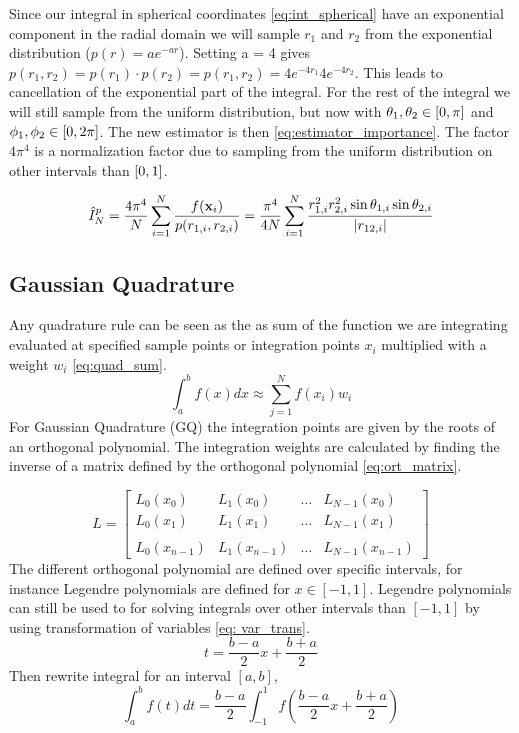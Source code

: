 Since our integral in spherical coordinates \cref{eq:int_spherical} have an exponential
component in the radial domain we will sample $r_1$ and $r_2$ from the exponential distribution
($p(r) = ae^{-ar}$). Setting a = 4 gives
$p(r_1, r_2) = p(r_1) \cdot p(r_2) = p(r_1,r_2) = 4e^{-4r_1} 4e^{-4r_2}$.
This leads to cancellation of the exponential part of the integral. For the
rest of the integral we will still sample from the uniform distribution,
but now with $\theta_1, \theta_2 \in \left[0, \pi\right]$ and
$\phi_1, \phi_2 \in \left[0, 2\pi\right]$.
The new estimator is then
\cref{eq:estimator_importance}. The factor $4\pi^4$ is a normalization factor due
to sampling from the uniform distribution on other intervals than $\left[0,1\right]$.

\begin{equation}
  \label{eq:estimator_importance}
  \hat{I}_N^p
  = \frac{4\pi^4}{N} \sum_{i=1}^{N} \frac{f(\mathbf{x}_i)}{p(r_{1,i},r_{2,i})}
  = \frac{\pi^4}{4N} \sum_{i=1}^{N}
  \frac{r_{1,i}^2 r_{2,i}^2 \sin{\theta_{1,i}} \sin{\theta_{2,i}}}{\abs{r_{12,i}}}
\end{equation}


\subsection{Gaussian Quadrature}
Any quadrature rule can be seen as the as sum of the function we are
integrating evaluated at specified sample points or integration points $x_i$
multiplied with a weight $w_i$ \cref{eq:quad_sum}.
\begin{equation}\label{eq:quad_sum}
  \int_{a}^{b} f(x)dx \approx \sum_{j=1}^{N} f(x_i) w_i
\end{equation}
For Gaussian Quadrature (GQ) the
integration points are given by the roots of an orthogonal polynomial. The
integration weights are calculated by finding the inverse of a matrix defined by
the orthogonal polynomial \cref{eq:ort_matrix}.

\begin{equation}\label{eq:ort_matrix}
  L = \begin{bmatrix}
    L_0(x_0) & L_1(x_0) & \dots & L_{N-1}(x_{0}) \\
    L_0(x_1) & L_1(x_1) & \dots & L_{N-1}(x_{1}) \\
    \\
    L_0(x_{n-1}) & L_1(x_{n-1}) & \dots & L_{N-1}(x_{n-1})
  \end{bmatrix}
\end{equation}
The different orthogonal polynomial are defined over specific intervals, for
instance Legendre polynomials are defined for $x \in [-1, 1]$. Legendre
polynomials can still be used to for solving integrals over other intervals
than $[-1,1]$ by using transformation of variables \cref{eq: var_trans}.
\begin{equation}\label{eq: var_trans}
  t = \frac{b-a}{2}x + \frac{b+a}{2}
\end{equation}
Then rewrite integral for an interval $[a,b]$,
\begin{equation}
  \int_a^b f(t)dt = \frac{b-a}{2}\int_{-1}^{1} f\left(\frac{b-a}{2}x + \frac{b+a}{2}\right)
\end{equation}

